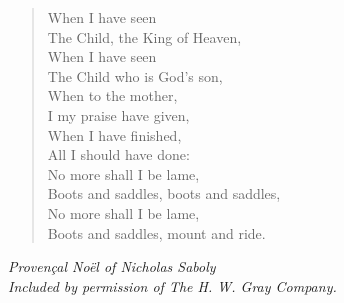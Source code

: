 \begin{verse}
When I have seen\\
\hspace*{2em}The Child, the King of Heaven,\\
When I have seen\\
\hspace*{2em}The Child who is God's son,\\
When to the mother,\\
\hspace*{2em}I my praise have given,\\
When I have finished,\\
\hspace*{2em}All I should have done:\\[0.7em]

\hspace*{2em}No more shall I be lame,\\
\hspace*{4em}Boots and saddles, boots and saddles,\\
\hspace*{2em}No more shall I be lame,\\
\hspace*{4em}Boots and saddles, mount and ride.%
\end{verse}

\vspace{0.5\baselineskip}
\noindent\textit{Provençal Noël of Nicholas Saboly}\\
\noindent\textit{Included by permission of The H. W. Gray Company.}

\newpage

